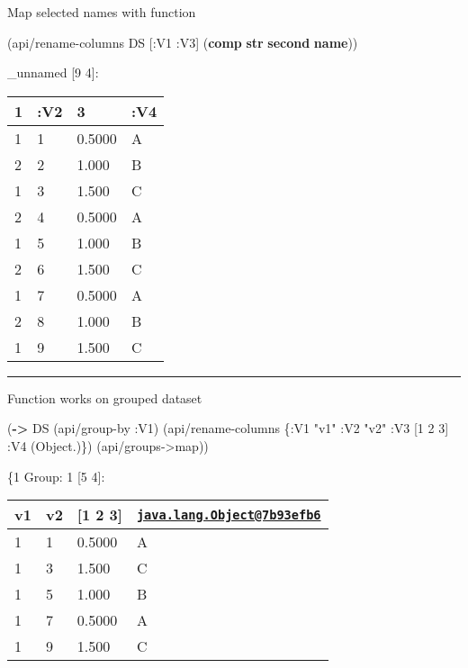 \documentclass[]{article}
\newenvironment{Shaded}{\begin{snugshade}}{\end{snugshade}}
\newcommand{\KeywordTok}[1]{\textcolor[rgb]{0.13,0.29,0.53}{\textbf{#1}}}
\newcommand{\DecValTok}[1]{\textcolor[rgb]{0.00,0.00,0.81}{#1}}
\newcommand{\StringTok}[1]{\textcolor[rgb]{0.31,0.60,0.02}{#1}}
\newcommand{\AttributeTok}[1]{\textcolor[rgb]{0.77,0.63,0.00}{#1}}
\newcommand{\NormalTok}[1]{#1}
\begin{document}
Map selected names with function

\begin{Shaded}
\begin{Highlighting}[]
\NormalTok{(api/rename-columns DS [}\AttributeTok{:V1} \AttributeTok{:V3}\NormalTok{] (}\KeywordTok{comp} \KeywordTok{str} \KeywordTok{second} \KeywordTok{name}\NormalTok{))}
\end{Highlighting}
\end{Shaded}

\_unnamed {[}9 4{]}:

\begin{longtable}[]{@{}llll@{}}
\toprule
1 & :V2 & 3 & :V4\tabularnewline
\midrule
\endhead
1 & 1 & 0.5000 & A\tabularnewline
2 & 2 & 1.000 & B\tabularnewline
1 & 3 & 1.500 & C\tabularnewline
2 & 4 & 0.5000 & A\tabularnewline
1 & 5 & 1.000 & B\tabularnewline
2 & 6 & 1.500 & C\tabularnewline
1 & 7 & 0.5000 & A\tabularnewline
2 & 8 & 1.000 & B\tabularnewline
1 & 9 & 1.500 & C\tabularnewline
\bottomrule
\end{longtable}

\begin{center}\rule{0.5\linewidth}{0.5pt}\end{center}

Function works on grouped dataset

\begin{Shaded}
\begin{Highlighting}[]
\NormalTok{(}\KeywordTok{->}\NormalTok{ DS}
\NormalTok{    (api/group-by }\AttributeTok{:V1}\NormalTok{)}
\NormalTok{    (api/rename-columns \{}\AttributeTok{:V1} \StringTok{"v1"}
                         \AttributeTok{:V2} \StringTok{"v2"}
                         \AttributeTok{:V3}\NormalTok{ [}\DecValTok{1} \DecValTok{2} \DecValTok{3}\NormalTok{]}
                         \AttributeTok{:V4}\NormalTok{ (Object.)\})}
\NormalTok{    (api/groups->map))}
\end{Highlighting}
\end{Shaded}

\{1 Group: 1 {[}5 4{]}:

\begin{longtable}[]{@{}llll@{}}
\toprule
v1 & v2 & {[}1 2 3{]} &
\href{mailto:java.lang.Object@7b93efb6}{\nolinkurl{java.lang.Object@7b93efb6}}\tabularnewline
\midrule
\endhead
1 & 1 & 0.5000 & A\tabularnewline
1 & 3 & 1.500 & C\tabularnewline
1 & 5 & 1.000 & B\tabularnewline
1 & 7 & 0.5000 & A\tabularnewline
1 & 9 & 1.500 & C\tabularnewline
\bottomrule
\end{longtable}
\end{document}
